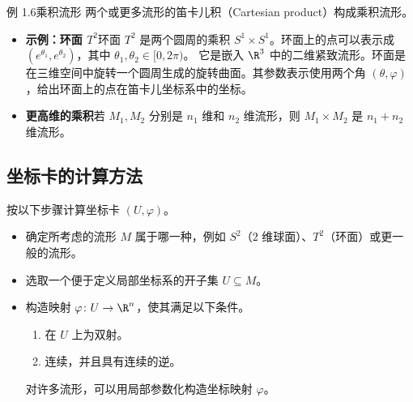 \begin{statement}{例 1.6}{乘积流形}
两个或更多流形的笛卡儿积（Cartesian product）构成乘积流形。
\begin{itemize}
  \item \textbf{示例：环面 $T^2$}\quad 环面 $T^2$ 是两个圆周的乘积 $S^1\times S^1$。环面上的点可以表示成 $(e^{\theta_1},e^{\theta_2})$，其中 $\theta_1,\theta_2\in[0,2\pi)$。 它是嵌入 $\R^3$ 中的二维紧致流形。环面是在三维空间中旋转一个圆周生成的旋转曲面。其参数表示使用两个角 $(\theta,\varphi)$，给出环面上的点在笛卡儿坐标系中的坐标。
  \item \textbf{更高维的乘积}\quad 若 $M_1,M_2$ 分别是 $n_1$ 维和 $n_2$ 维流形，则 $M_1\times M_2$ 是 $n_1+n_2$ 维流形。
\end{itemize}
\end{statement}

\subsection{坐标卡的计算方法}
按以下步骤计算坐标卡 $(U,\varphi)$。

\begin{itemize}
  \item 确定所考虑的流形 $M$ 属于哪一种，例如 $S^2$（$2$ 维球面）、$T^2$（环面）或更一般的流形。
  \item 选取一个便于定义局部坐标系的开子集 $U\subseteq M$。
\end{itemize}

\begin{itemize}
  \item 构造映射 $\varphi\colon U\to\R^n$，使其满足以下条件。
  \begin{enumerate}
    \item 在 $U$ 上为双射。
    \item 连续，并且具有连续的逆。
  \end{enumerate}
  对许多流形，可以用局部参数化构造坐标映射 $\varphi$。
\end{itemize}

